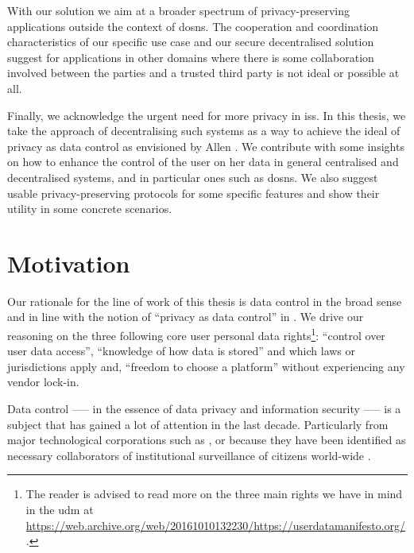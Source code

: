 \documentclass[showtrims,oldfontcommands]{kthesis}
\begin{document}
With our solution we aim at a broader spectrum of privacy-preserving applications 
outside the context of \acp{dosn}. The cooperation and coordination characteristics 
of our specific use case and our secure decentralised solution suggest for applications 
in other domains where there is some collaboration involved between the parties 
and a trusted third party is not ideal or possible at all.

Finally, we acknowledge the urgent need for more privacy in \acp{is}. 
In this thesis, we take the approach of decentralising such systems as a way to 
achieve the ideal of privacy as data control as envisioned by Allen \cite{Allen99}. 
We contribute with some insights on how to enhance the control of the user on her 
data in general centralised and decentralised systems, and in particular ones such 
as \acp{dosn}. We also suggest usable privacy-preserving protocols for some specific 
features and show their utility in some concrete scenarios.

\section{Motivation}
    \label{section:motivation}
Our rationale for the line of work of this thesis is data control in the broad sense 
and in line with the notion of ``privacy as data control'' in \cite{Allen99}. We 
drive our reasoning on the three following core user personal data rights\footnote{The 
reader is advised to read more on the three main rights we have in mind in the \Ac{udm} 
at \url{https://web.archive.org/web/20161010132230/https://userdatamanifesto.org/}.}: 
``control over user data access'', ``knowledge of how data is stored'' and which 
laws or jurisdictions apply and, ``freedom to choose a platform'' without experiencing 
any vendor lock-in.


Data control —-- in the essence of data privacy and information security —-- is a 
subject that has gained a lot of attention in the last decade. Particularly from 
major technological corporations such as \Google, \Apple or \Facebook because they 
have been identified as necessary collaborators of institutional surveillance of 
citizens world-wide \cite{Lyon14}.
\end{document}

